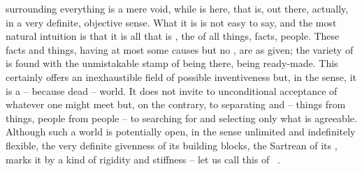 

\pa\label{closed}  surrounding everything is a mere void, while
 is here, that is, out there, actually, in a very definite,
objective sense. What it is is not easy to say, and the most natural intuition
is that it is all that is , the  of all things, facts,
people. These facts and things, having at most some causes but no ,
are  as given; the variety of 
 is found with the unmistakable stamp of being there,
being ready-made.
This certainly offers an inexhaustible field of possible
inventiveness but, in the  sense, it is a  -- because
dead -- world. It
does not invite to unconditional acceptance of whatever one might meet but, on
the contrary, to separating and  -- things from things, people
from people -- to searching for and selecting
only what is agreeable. Although such a world is potentially open, in the sense
unlimited and indefinitely flexible, the very definite givenness of its building
blocks, the Sartrean  of its , marks it by a kind
of rigidity and stiffness -- 
let us call this  of \No\ .


